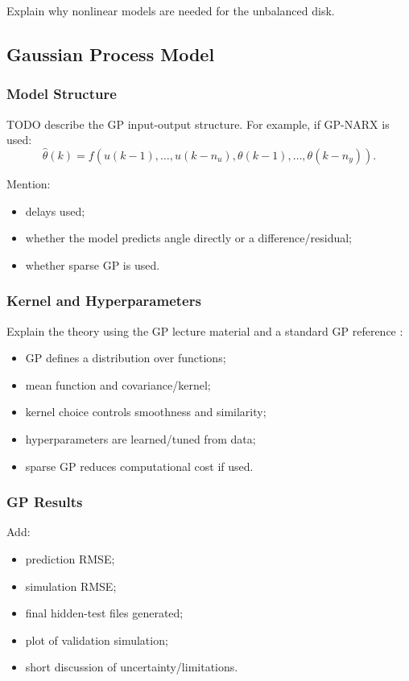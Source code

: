 \documentclass[conference]{IEEEtran}
\begin{document}
Explain why nonlinear models are needed for the unbalanced disk.

\subsection{Gaussian Process Model}

\subsubsection{Model Structure}
TODO describe the GP input-output structure.
For example, if GP-NARX is used:
\begin{equation}
\hat{\theta}(k) =
f(u(k-1), \ldots, u(k-n_u), \theta(k-1), \ldots, \theta(k-n_y)).
\end{equation}

Mention:
\begin{itemize}
    \item delays used;
    \item whether the model predicts angle directly or a difference/residual;
    \item whether sparse GP is used.
\end{itemize}

\subsubsection{Kernel and Hyperparameters}
Explain the theory using the GP lecture material and a standard GP reference \cite{course5sc28,rasmussen2006gpml}:
\begin{itemize}
    \item GP defines a distribution over functions;
    \item mean function and covariance/kernel;
    \item kernel choice controls smoothness and similarity;
    \item hyperparameters are learned/tuned from data;
    \item sparse GP reduces computational cost if used.
\end{itemize}

\subsubsection{GP Results}
Add:
\begin{itemize}
    \item prediction RMSE;
    \item simulation RMSE;
    \item final hidden-test files generated;
    \item plot of validation simulation;
    \item short discussion of uncertainty/limitations.
\end{itemize}
\end{document}
